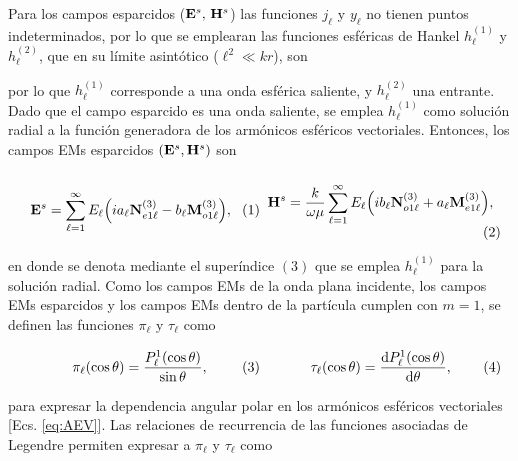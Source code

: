 Para los campos esparcidos ($\vb{E}^s,\,\vb{H}^s$) las funciones $j_\ell$ y $y_\ell$ no tienen puntos indeterminados, por lo que se emplearan las funciones esféricas de Hankel $h_\ell^{(1)}$ y $h_\ell^{(2)}$, que en su límite asintótico ($\ell^2\ll kr$), son \cite{bohren1998absorption}


\vspace*{-1em}\noindent
por lo que $h_\ell^{(1)}$ corresponde a una onda esférica saliente, y $h_\ell^{(2)}$ una entrante. Dado que el campo esparcido es una onda saliente, se emplea $h_\ell^{(1)}$ como solución radial a la función generadora de los armónicos esféricos vectoriales. Entonces, los campos EMs esparcidos $(\vb{E}^s,\vb{H}^s)$ son 
	\begin{subequations}
	\eqhalf{\vb{E}^s = \sum_{\ell =1}^\infty E_\ell \qty(i a_\ell \vb{N}_{e1\ell}^{(3)}- b_\ell\vb{M}_{o1\ell}^{(3)}),
		\label{eqs:EsAEV}}
	\eqhalf{\vb{H}^s = \frac{k}{\omega\mu} \sum_{\ell =1}^\infty E_\ell\qty(ib_\ell\vb{N}_{o1\ell}^{(3)}+a_\ell\vb{M}_{e1\ell}^{(3)}),
		\label{eqs:HsAEV}}	
	\label{eq:EHsAEV}		
	\end{subequations}
		
\noindent
en donde se denota mediante el superíndice $(3)$ que se emplea $h_\ell^{(1)}$ para la solución radial. Como los campos EMs de la onda plana incidente, los campos EMs esparcidos y los campos EMs dentro de la partícula  cumplen con $m= 1$, se definen las funciones   $\pi_\ell$ y $\tau_\ell$ como  

	\begin{subequations}
	\eqhalf{\pi_\ell(\cos\theta)= \frac{P_\ell^1(\cos\theta)}{\sin\theta},
		\label{eqs:pi}}
	\eqhalf{\tau_\ell(\cos\theta) = \dv{P_\ell^1(\cos\theta)}{\theta},
		\label{eqs:tau}}	
	\label{eq:pitau}		
	\end{subequations}

\noindent
para expresar la dependencia angular polar en los armónicos esféricos vectoriales [Ecs. \eqref{eq:AEV}]. Las relaciones de recurrencia de las funciones asociadas de Legendre \cite{arfken2001methods} permiten expresar a  $\pi_\ell$ y $\tau_\ell$ como  \cite{bohren1998absorption}


